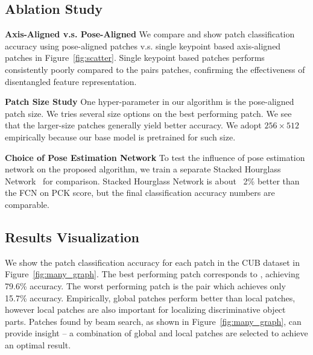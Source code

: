 \subsection{Ablation Study}

\textbf{Axis-Aligned v.s. Pose-Aligned}
We compare and show patch classification accuracy using pose-aligned patches v.s. single keypoint based axis-aligned patches in Figure~\ref{fig:scatter}. Single keypoint based patches performs consistently poorly compared to the pairs patches, confirming the effectiveness of disentangled feature representation.

\textbf{Patch Size Study}
One hyper-parameter in our algorithm is the pose-aligned patch size. We tries several size options on the best performing patch. We see that the larger-size patches generally yield better accuracy. We adopt $256 \times 512$ empirically because our base model is pretrained for such size.

\textbf{Choice of Pose Estimation Network} To test the influence of pose estimation network on the proposed algorithm, we train a separate Stacked Hourglass Network~\cite{newell2016stacked} for comparison. Stacked Hourglass Network is about ~2\% better than the FCN on PCK score, but the final classification accuracy numbers are comparable.

\subsection{Results Visualization}
\begin{comment}
Given 105 patches on one image, we are interested to know how prediction accuracy is distributed across the patches. 
We show the patch effectiveness histogram in Figure~\ref{fig:patch_classification}. We notice there is one patch does extremely poorly, only achieving 14.3\% accuracy.
This patch corresponds to the \patchpair{left-leg}{right-leg} pair
\end{comment}

We show the patch classification accuracy for each patch in the CUB dataset in Figure~\ref{fig:many_graph}. The best performing patch corresponds to , achieving 79.6\% accuracy. The worst performing patch is the  pair which achieves only  15.7\% accuracy. Empirically, global patches perform better than local patches, however local patches are also important for localizing discriminative object parts. Patches found by beam search, as shown in Figure~\ref{fig:many_graph}, can provide insight -- a combination of global and local patches are selected to achieve an optimal result.




